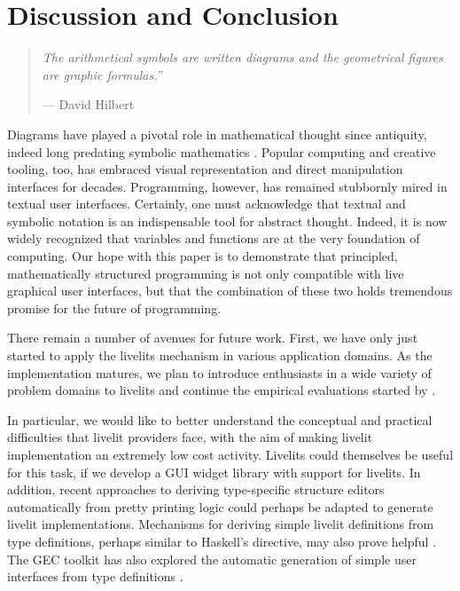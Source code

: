 \section{Discussion and Conclusion}\label{sec:discussion}\label{sec:conclusion}
\begin{quote}
  \textit{
  The arithmetical symbols are written diagrams and the geometrical figures are graphic formulas.''
  }
  
  \vspace{3pt}
  
  \hfill{}--- David Hilbert~\cite{hilbert1902mathematical}
  \end{quote}

  Diagrams have played a pivotal role in mathematical thought since antiquity,
  indeed long predating symbolic mathematics \cite{cajori1993history}. 
  Popular computing and creative tooling, too, has embraced visual representation and direct manipulation 
  interfaces for decades.
  Programming, however, has remained stubbornly mired in textual user interfaces. 
  Certainly, one must acknowledge that textual and symbolic notation
  is an indispensable tool for abstract thought. 
  Indeed, it is now widely recognized that variables and functions are at the 
  very foundation of computing. 
  Our hope with this paper is to demonstrate that principled, mathematically structured
  programming is not only compatible with live graphical user interfaces, but that the 
  combination of these two holds tremendous promise for the future of programming.

  There remain a number of avenues for future work. First, we have only just started
  to apply the livelits mechanism in various application domains. As the implementation
  matures, we plan to introduce enthusiasts in a wide variety of problem domains
  to livelits and continue the empirical evaluations started by \citet{Graphite}.

  In particular, we would like to better understand the conceptual and practical 
  difficulties that livelit providers face, with the aim of making livelit 
  implementation an extremely low cost activity. Livelits could themselves be 
  useful for this task, if we develop a GUI widget library with support for livelits.
In addition, recent approaches to deriving type-specific structure editors automatically from pretty printing logic \cite{hempeltiny} could perhaps 
be adapted to generate livelit implementations. Mechanisms for deriving simple 
livelit definitions from type definitions, perhaps similar to Haskell's  directive, 
may also prove helpful \cite{magalhaes2010generic}. The GEC toolkit has also explored  
the automatic generation of simple user interfaces from type definitions \cite{DBLP:conf/afp/AchtenEPW04}.

